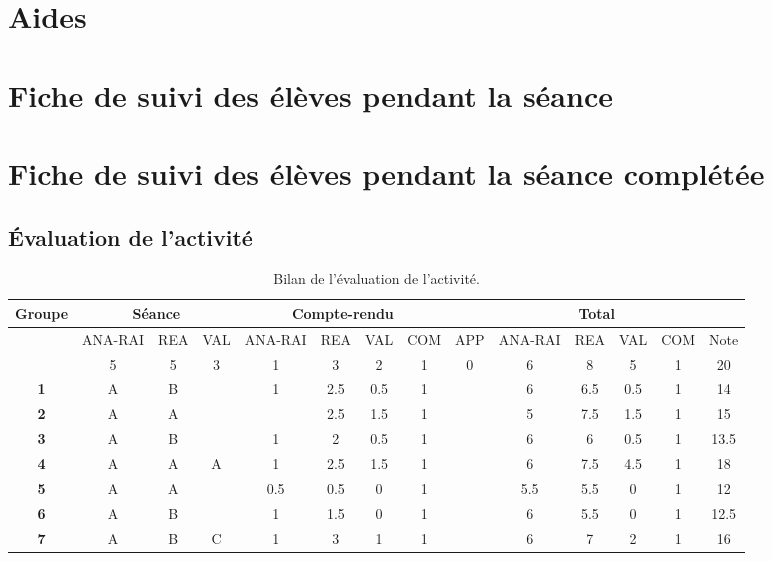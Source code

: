 \documentclass[12pt,a4paper, fleqn]{report}
\newcommand{\app}{\colorbox{bleu_c}{\textcolor{bleu_f}{APP}}}
\newcommand{\rea}{\colorbox{yellow_c}{\textcolor{yellow_f}{REA}}}
\newcommand{\anarai}{\colorbox{green_c}{\textcolor{green_f}{ANA-RAI}}}
\newcommand{\val}{\colorbox{orange_c}{\textcolor{orange_f}{VAL}}}
\newcommand{\com}{\colorbox{red_c}{\textcolor{red_f}{COM}}}
\begin{document}


\chapter{Aides}
\label{ann:aides}



\chapter{Fiche de suivi des élèves pendant la séance}
\label{ann:suivi}



\chapter{Fiche de suivi des élèves pendant la séance complétée}
\label{ann:suivi_comp}

\begin{landscape}



\chapter{Évaluation de l'activité}
\label{ann:eval}
\vfill
\begin{table}[h]
\renewcommand\arraystretch{1.5}		%
\begin{center}
\begin{tabular}{|c|c|c|c|c|c|c|c|c|c|c|c|c|c|}
\hline
\textbf{Groupe} & \multicolumn{3}{c|}{\textbf{Séance}} & \multicolumn{4}{c|}{\textbf{Compte-rendu}} & \multicolumn{6}{c|}{\textbf{Total}} \\
\hline 
& \anarai & \rea & \val & \anarai & \rea &\val & \com & \app & \anarai & \rea & \val & \com & Note \\
\hline
& 5 & 5 & 3 & 1 & 3 & 2 & 1 & 0 & 6 & 8 & 5 & 1 & 20 \\
\hline\hline
\textbf{1} & A & B & & 1 & 2.5 & 0.5 & 1 & & 6 & 6.5 & 0.5 & 1 & 14 \\
\hline
\textbf{2} & A & A & & & 2.5 & 1.5 & 1 & & 5 & 7.5 & 1.5 & 1 & 15 \\
\hline
\textbf{3} & A & B & & 1 & 2 & 0.5 & 1 & & 6 & 6 & 0.5 & 1 & 13.5 \\
\hline
\textbf{4} & A & A & A & 1 & 2.5 & 1.5 & 1 & & 6 & 7.5 & 4.5 & 1 & 18 \\
\hline
\textbf{5} & A & A & & 0.5 & 0.5 & 0 & 1 & & 5.5 & 5.5 & 0 & 1 & 12 \\
\hline
\textbf{6} & A & B & & 1 & 1.5 & 0 & 1 & & 6 & 5.5 & 0 & 1 & 12.5  \\
\hline
\textbf{7} & A & B & C & 1 & 3 & 1 & 1 & & 6 & 7 & 2 & 1 & 16 \\
\hline
\end{tabular}
\end{center}
\caption{Bilan de l'évaluation de l'activité.}
\label{tab:eval}
\end{table}
\vfill
\end{landscape}
\end{document}
